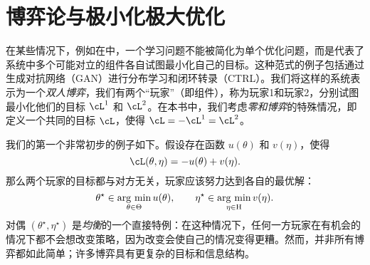 \documentclass[../../book-main.tex]{subfiles}
\begin{document}
\section{博弈论与极小化极大优化} \label{sec:minimax}\label{sec:game_theory}

在某些情况下，例如在中，一个学习问题不能被简化为单个优化问题，而是代表了系统中多个可能对立的组件各自试图最小化自己的目标。这种范式的例子包括通过生成对抗网络（GAN）进行分布学习和闭环转录（CTRL）。我们将这样的系统表示为一个\textit{双人博弈}，我们有两个“玩家”（即组件），称为玩家1和玩家2，分别试图最小化他们的目标 \(\cL^{1}\) 和 \(\cL^{2}\)。在本书中，我们考虑\textit{零和博弈}的特殊情况，即定义一个共同的目标 \(\cL\)，使得 \(\cL = -\cL^{1} = \cL^{2}\)。

我们的第一个非常初步的例子如下。假设存在函数 \(u(\theta)\) 和 \(v(\eta)\)，使得
\begin{equation}
    \cL(\theta, \eta) = -u(\theta) + v(\eta).
\end{equation}
那么两个玩家的目标都与对方无关，玩家应该努力达到各自的最优解：
\begin{equation}
    \theta^{\star} \in \operatorname*{arg\ min}_{\theta \in \Theta}u(\theta), \qquad \eta^{\star} \in \operatorname*{arg\ min}_{\eta \in \mathrm{H}}v(\eta).
\end{equation}
对偶 \((\theta^{\star}, \eta^{\star})\) 是\textit{均衡}的一个直接特例：在这种情况下，任何一方玩家在有机会的情况下都不会想改变策略，因为改变会使自己的情况变得更糟。然而，并非所有博弈都如此简单；许多博弈具有更复杂的目标和信息结构。
\end{document}
